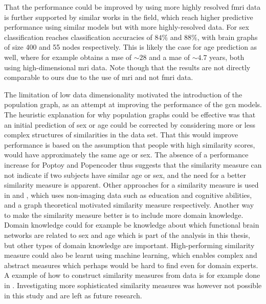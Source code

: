 

That the performance could be improved by using more highly resolved \acrshort{fmri} data is further supported by similar works in the field, which reach higher predictive performance using similar models but with more highly-resolved data. For sex classification \cite{arslan, understanding_gnn} reaches classification accuracies of $84\%$ and $88\%$, with brain graphs of size 400 and 55 nodes respectively. This is likely the case for age prediction as well, where for example \cite{stankeviciute} obtains a \acrshort{mse} of $\sim28$ and \cite{amoroso_multiplex_age} a \acrshort{mae} of $\sim4.7$ years, both using high-dimensional \acrshort{mri} data. Note though that the results are not directly comparable to ours due to the use of \acrshort{mri} and not \acrshort{fmri} data.

The limitation of low data dimensionality motivated the introduction of the population graph, as an attempt at improving the performance of the \acrshort{gcn} models. The heuristic explanation for why population graphs could be effective was that an initial prediction of sex or age could be corrected by considering more or less complex structures of similarities in the data set. That this would improve performance is based on the assumption that people with high similarity scores, would have approximately the same age or sex. The absence of a performance increase for Poptoy and Popencoder thus suggests that the similarity measure can not indicate if two subjects have similar age or sex, and the need for a better similarity measure is apparent. Other approaches for a similarity measure is used in \cite{stankeviciute} and \cite{higcn}, which uses non-imaging data such as education and cognitive abilities, and a graph theoretical motivated similarity measure respectively. Another way to make the similarity measure better is to include more domain knowledge. Domain knowledge could for example be knowledge about which functional brain networks are related to sex and age which is part of the analysis in this thesis, but other types of domain knowledge are important. High-performing similarity measure could also be learnt using machine learning, which enables complex and abstract measures which perhaps would be hard to find even for domain experts. A example of how to construct similarity measures from data is for example done in \cite{sim_meas_constr}. Investigating more sophisticated similarity measures was however not possible in this study and are left as future research. 


